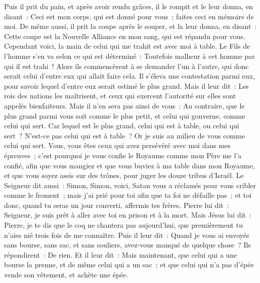 \begin{multicols}{2}
Puis il prit du pain, et après avoir rendu grâces, il le rompit et le leur donna, en disant~: Ceci est mon corps, qui est donné pour vous~; faites ceci en mémoire de moi.
De même aussi, il prit la coupe après le souper, et la leur donna, en disant~: Cette coupe est la Nouvelle Alliance en mon sang, qui est répandu pour vous.
Cependant voici, la main de celui qui me trahit est avec moi à table.
Le Fils de l'homme s'en va selon ce qui est déterminé~: Toutefois malheur à cet homme par qui il est trahi~!
Alors ils commencèrent à se demander l'un à l'autre, qui donc serait celui d'entre eux qui allait faire cela.
Il s'éleva une contestation parmi eux, pour savoir lequel d'entre eux serait estimé le plus grand.
Mais il leur dit~: Les rois des nations les maîtrisent, et ceux qui exercent l'autorité sur elles sont appelés bienfaiteurs.
Mais il n'en sera pas ainsi de vous~: Au contraire, que le plus grand parmi vous soit comme le plus petit, et celui qui gouverne, comme celui qui sert.
Car lequel est le plus grand, celui qui est à table, ou celui qui sert~? N'est-ce pas celui qui est à table~? Or je suis au milieu de vous comme celui qui sert.
Vous, vous êtes ceux qui avez persévéré avec moi dans mes épreuves~;
c'est pourquoi je vous confie le Royaume comme mon Père me l'a confié,
afin que vous mangiez et que vous buviez à ma table dans mon Royaume, et que vous soyez assis sur des trônes, pour juger les douze tribus d'Israël.
Le Seigneur dit aussi~: Simon, Simon, voici, Satan vous a réclamés pour vous cribler comme le froment~;
mais j'ai prié pour toi afin que ta foi ne défaille pas~; et toi donc, quand tu seras un jour converti, affermis tes frères.
Pierre lui dit~: Seigneur, je suis prêt à aller avec toi en prison et à la mort.
Mais Jésus lui dit~: Pierre, je te dis que le coq ne chantera pas aujourd'hui, que premièrement tu n'aies nié trois fois de me connaître.
Puis il leur dit~: Quand je vous ai envoyés sans bourse, sans sac, et sans souliers, avez-vous manqué de quelque chose~? Ils répondirent~: De rien.
Et il leur dit~: Mais maintenant, que celui qui a une bourse la prenne, et de même celui qui a un sac~; et que celui qui n'a pas d'épée vende son vêtement, et achète une épée.

\end{multicols}
